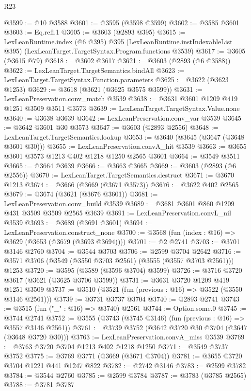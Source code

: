 \begin{lexlean}{R23}
\begin{coremodule}
@3599 := @10 @3588
@3601 := @3595 (@3598 @3599)
@3602 := @3585 @3601
@3603 := Eq.refl.{1}
@3605 := @3603 (@2893 @395)
@3615 := LexLeanRuntime.index
    (@6 @395)
    @395
    (LexLeanRuntime.instIndexableList @395)
    (LexLeanTarget.TargetSyntax.Program.functions @3539)
@3617 := @3605 (@3615 @79)
@3618 := @3602 @3617
@3621 := @3603 (@2893 (@6 @3588))
@3622 := LexLeanTarget.TargetSemantics.bindAll
@3623 := LexLeanTarget.TargetSyntax.Function.parameters
@3625 := @3622 (@3623 @1253)
@3629 := @3618 (@3621 (@3625 @3575 @3599))
@3631 := LexLeanPreservation.conv_match @3539
@3638 := @3631 @3601 @1209 @419 @1251 @3509 @3511 @3573
@3639 := LexLeanTarget.TargetSyntax.Value.none
@3640 := @3638 @3639
@3642 := LexLeanPreservation.conv_var @3539
@3645 := @3642 @3601 @30 @3573
@3647 := @3603 (@2893 @2556)
@3648 := LexLeanTarget.TargetSemantics.lookup
@3653 := @3640 (@3645 (@3647 (@3648 @3601 @30)))
@3655 := LexLeanPreservation.convA_hit @3539
@3663 := @3655 @3601 @3573 @1213 @402 @1218 @1250 @2565 @3601
@3664 := @3549 @3511
@3665 := @3664 @3639
@3666 := @3663 @3665
@3669 := @3603 (@2893 (@6 @2556))
@3670 := LexLeanTarget.TargetSemantics.destruct
@3671 := @3670 @1213
@3674 := @3666 (@3669 (@3671 @3573))
@3676 := @3622 @402 @2565
@3679 := @3674 (@3621 (@3676 @3601))
@3681 := LexLeanPreservation.conv_build @3539
@3689 := @3681 @3601 @860 @1209 @431 @3509 @3509 @2565 @3639
@3691 := LexLeanPreservation.convL_nil @3539
@3693 := @3689 (@3691 @3601)
@3694 := LexLeanPreservation.construct_none
@3700 := @3568 (fun (index : @16) => @3629 (@3653 (@3679 (@3693 @3694))))
@3701 := @2 @2741
@3703 := @3701 @3146 @2760
@3704 := @3544 @3703
@3706 := @2599 @3704 @2642
@3716 := @3571 @3706 (@3549 (@3550 @3703 @2561) (@3555 (@3557 @3703 @2561))) @1253
@3720 := @3595 (@3589 (@3596 @3704) @3599)
@3726 := @3716 @3720 @3617 (@3621 (@3625 @3706 @3599))
@3731 := @3631 @3720 @1209 @419 @1251 @3509
@3737 := @3510 (@3521 (fun (previous : @16) => @3522 (@3550 @3146 @2561)))
@3739 := @3731 @3737 @3704
@3740 := @2893 @2741
@3743 := @3515 (fun ("_" : @16) => @3740) @2561
@3744 := Option.some.{0}
@3745 := @3744 @2741
@3752 := @3555 (@3743 (@3745 @3146) (fun (previous : @16) => @3557 @3146 @2561))
@3761 := @3739 @3752 (@3642 @3720 @30 @3704 (@3647 (@3648 @3720 @30)))
@3763 := LexLeanPreservation.convA_miss @3539
@3769 := @3763 @3720 @3704 @1213 @402 @1218 @1250
@3771 := @3549 @3737 @3752
@3775 := @3769 @3771 (@3669 (@3671 @3704))
@3781 := @3655 @3720 @3704 @1221 @441 @1247 @822
@3782 := @2742 @3146
@3783 := @2599 @3782
@3784 := @3544 @2760
@3785 := @2599 @3784
@3787 := @3783 (@3785 @2565)
@3788 := @3781 @3787

\end{coremodule}
\end{lexlean}

